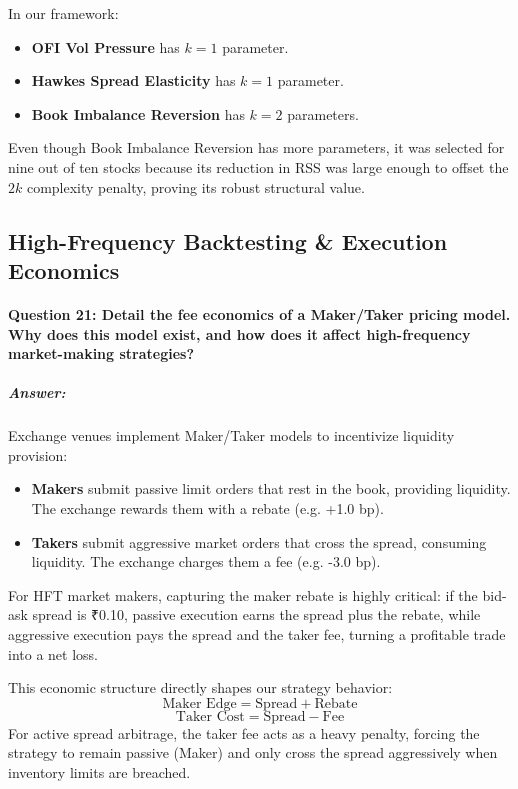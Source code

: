 \documentclass[11pt,a4paper]{article}
\begin{document}
In our framework:
\begin{itemize}
    \item \textbf{OFI Vol Pressure} has $k=1$ parameter.
    \item \textbf{Hawkes Spread Elasticity} has $k=1$ parameter.
    \item \textbf{Book Imbalance Reversion} has $k=2$ parameters.
\end{itemize}
Even though Book Imbalance Reversion has more parameters, it was selected for nine out of ten stocks because its reduction in RSS was large enough to offset the $2k$ complexity penalty, proving its robust structural value.

\subsection{High-Frequency Backtesting & Execution Economics}

\paragraph{Question 21: Detail the fee economics of a Maker/Taker pricing model. Why does this model exist, and how does it affect high-frequency market-making strategies?}
\subparagraph{Answer:}
Exchange venues implement Maker/Taker models to incentivize liquidity provision:
\begin{itemize}
    \item \textbf{Makers} submit passive limit orders that rest in the book, providing liquidity. The exchange rewards them with a rebate (e.g. +1.0 bp).
    \item \textbf{Takers} submit aggressive market orders that cross the spread, consuming liquidity. The exchange charges them a fee (e.g. -3.0 bp).
\end{itemize}
For HFT market makers, capturing the maker rebate is highly critical: if the bid-ask spread is ₹0.10, passive execution earns the spread plus the rebate, while aggressive execution pays the spread and the taker fee, turning a profitable trade into a net loss.

This economic structure directly shapes our strategy behavior:
\begin{equation}
    \text{Maker Edge} = \text{Spread} + \text{Rebate}
\end{equation}
\begin{equation}
    \text{Taker Cost} = \text{Spread} - \text{Fee}
\end{equation}
For active spread arbitrage, the taker fee acts as a heavy penalty, forcing the strategy to remain passive (Maker) and only cross the spread aggressively when inventory limits are breached.
\end{document}
